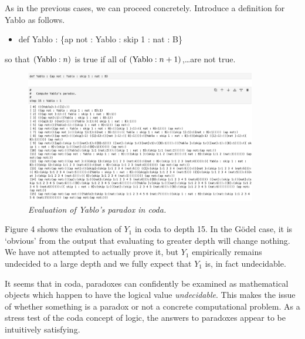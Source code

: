 \documentclass[11pt]{article}
\begin{document}
     As in the previous cases, we can proceed concretely.  Introduce a definition for Yablo as follows. 
\begin{itemize}
\item def Yablo : \{ap not : Yablo : skip 1 : nat : B\}
\end{itemize}
so that $({\rm Yablo}:n)$ is true if all of $({\rm Yablo}:n+1)$,\dots are not true.   
\begin{figure}[h]
\centering
\includegraphics[width=0.9\textwidth]{Yablo.png}
\caption{{\it Evaluation of Yablo's paradox in coda.}}
\end{figure} 
Figure 4 shows the evaluation of $Y_1$ in coda to depth 15.  In the G\"odel case, it is `obvious' from 
the output that evaluating to greater depth will change nothing.  We have not attempted to actually 
prove it, but $Y_1$ empirically remains undecided to a large depth and we fully expect that 
$Y_1$ is, in fact undecidable.  

It seems that in coda, paradoxes can confidently be examined as mathematical objects which 
happen to have the logical value {\it undecidable}.  This makes the issue of whether something 
is a paradox or not a concrete computational problem.  As a stress test of the coda concept 
of logic, the answers to paradoxes appear to be intuitively satisfying. 
\end{document}
